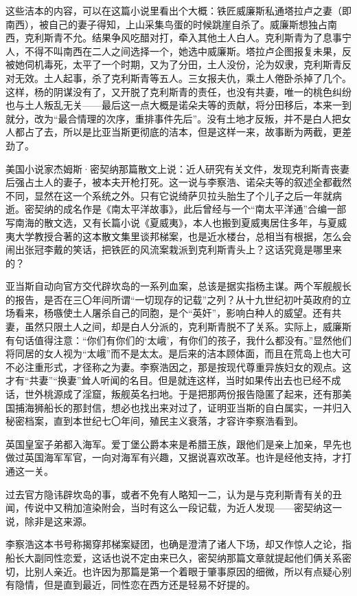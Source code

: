 \par 这些洁本的内容，可以在这篇小说里看出个大概：铁匠威廉斯私通塔拉卢之妻（即南西），被自己的妻子得知，上山采集鸟蛋的时候跳崖自杀了。威廉斯想独占南西，克利斯青不允。结果争风吃醋对打，牵入其他土人白人。克利斯青为了息事宁人，不得不叫南西在二人之间选择一个，她选中威廉斯。塔拉卢企图报复未果，反被她伺机毒死，太平了一个时期，又为了分田，土人没份，沦为奴隶，克利斯青反对无效。土人起事，杀了克利斯青等五人。三女报夫仇，乘土人倦卧杀掉了几个。这样，杨的阴谋没有了，又开脱了克利斯青的责任，也没有共妻，唯一的桃色纠纷也与土人叛乱无关——最后这一点大概是诺朵夫等的贡献，将分田移后，本来一到就分，改为“最合情理的次序，重排事件先后”。没有土地才反叛，并不是白人把女人都占了去，所以是比亚当斯更彻底的洁本，但是这样一来，故事断为两截，更差劲了。
\par 美国小说家杰姆斯·密契纳那篇散文上说：近人研究有关文件，发现克利斯青丧妻后强占土人的妻子，被本夫开枪打死。这一说与李察浩、诺朵夫等的叙述全都截然不同，显然在这一个系统之外。只有它说绮萨贝拉头胎生了个儿子之后一年就病逝。密契纳的成名作是《南太平洋故事》，此后曾经与一个“南太平洋通”合编一部写南海的散文选，又有长篇小说《夏威夷》，本人也搬到夏威夷居住多年，与夏威夷大学教授合著的这本散文集里谈邦梯案，也是近水楼台，总相当有根据，怎么会闹出张冠李戴的笑话，把铁匠的风流案栽派到克利斯青头上？这话究竟是哪里来的？
\par 亚当斯自动向官方交代辟坎岛的一系列血案，总该是据实指杨主谋。两个军舰舰长的报告，是否在三〇年间所谓“一切现存的记载”之列？从十九世纪初叶英政府的立场看来，杨嗾使土人屠杀自己的同胞，是个“英奸”，影响白种人的威望。还有共妻，虽然只限土人之间，却是白人分派的，克利斯青脱不了关系。实际上，威廉斯有句话值得注意：“你们有你们的‘太峨’，有你们的孩子，我什么都没有。”显然他们将同居的女人视为“太峨”而不是太太。是后来的洁本顾体面，而且在荒岛上也大可不必注重形式，才径称之为妻。李察浩因之，那是按现代尊重异族妇女的观点。这才有“共妻”“换妻”耸人听闻的名目。但是就连这样，当时如果传出去也已经不成话，世外桃源成了淫窟，叛舰英名扫地。于是把那两份报告隐匿了起来，还有那美国捕海狮船长的那封信，想必也找出来对过了，证明亚当斯的自白属实，一并归入秘密档案，直到本世纪七〇年间，殖民主义衰落，才容许李察浩看到。
\par 英国皇室子弟都入海军。爱丁堡公爵本来是希腊王族，跟他们是亲上加亲，早先也做过英国海军军官，一向对海军有兴趣，又据说喜欢改革。也许是经他支持，才打通这一关。
\par 过去官方隐讳辟坎岛的事，或者不免有人略知一二，认为是与克利斯青有关的丑闻，传说中又稍加渲染附会，当时有这么一段记载，为近人发现——密契纳这一说，除非是这来源。
\par 李察浩这本书号称揭穿邦梯案疑团，也确是澄清了诸人下场，却又作惊人之论，指船长大副同性恋爱，这话也说不定由来已久，密契纳那篇文章就提起他们俩关系密切，比别人亲近。也许因为那篇是第一个着眼于肇事原因的细微，所以有点疑心别有隐情，但是直到最近，同性恋在西方还是轻易不好提的。

